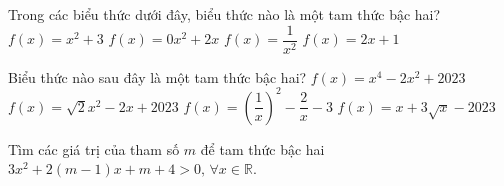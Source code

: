 \begin{ex}%
	Trong các biểu thức dưới đây, biểu thức nào là  một tam thức bậc hai?
	 \choice
		{\True $f(x)=x^2+3$} 
		{$f(x)=0 x^2+2  x$}
		{$f(x)=\dfrac{1}{x^2}$} 
		{$f(x)=2 x+1$} 
\end{ex}

\begin{ex}%
	Biểu thức nào sau đây là một  tam thức bậc hai?
	\choice 
		{$f(x)=x^4-2x^2+2023$} 
		{\True $f(x)=\sqrt{2}x^2-2x+2023$} 
		 {$f(x)=\left(\dfrac{1}{x}\right)^2-\dfrac{2}{x}-3$}
		{$f(x)=x+3\sqrt{x}-2023$} 
\end{ex}

\begin{bt}%
	Tìm các giá trị của tham số $m$ để tam thức bậc hai $3x^2+2(m-1)x+m+4>0,\,\forall x \in \mathbb{R}$.
\end{bt}

